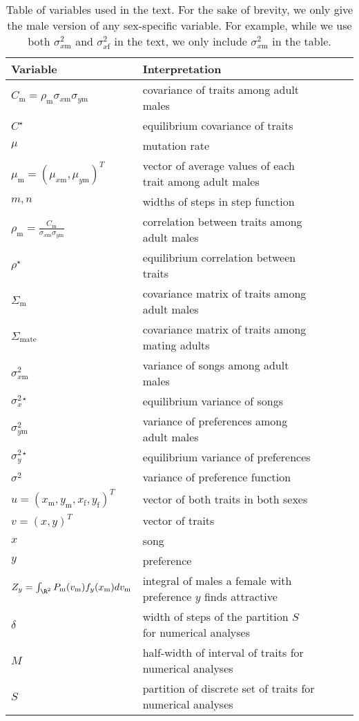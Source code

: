 \documentclass[12pt]{article}
\newcommand{\x}[1]{\text{#1}}
\begin{document}



\newpage

\begin{table}[tp]
\caption{\label{variables} Table of variables used in the text. For the sake of brevity, we only give the male version of any sex-specific variable. For example, while we use both $\sigma_{x\x{m}}^2$ and $\sigma_{x\x{f}}^2$ in the text, we only include $\sigma_{x\x{m}}^2$ in the table.}
\vspace{5pt}
\begin{tabular}{lllll}
Variable & Interpretation
\\\hline $C_\x{m}=\rho_\x{m}\sigma_{x\x{m}}\sigma_{y\x{m}}$ & covariance of traits among adult males
\\ $C^\star$ & equilibrium covariance of traits
\\ $\mu$ & mutation rate 
\\$\mu_\x{m}=(\mu_{x\x{m}},\mu_{y\x{m}})^T$ & vector of average values of each trait among adult males 
\\$m,n$ & widths of steps in step function 
\\ $\rho_\x{m}=\frac{C_\x{m}}{\sigma_{x\x{m}}\sigma_{y\x{m}}}$ & correlation between traits among adult males
\\ $\rho^\star$ & equilibrium correlation between traits
\\$\Sigma_\x{m}$ & covariance matrix of traits among adult males
\\$\Sigma_\text{mate}$ & covariance matrix of traits among mating adults
\\$\sigma_{x\x{m}}^2$ & variance of songs among adult males
\\$\sigma_{x}^{2\star}$ & equilibrium variance of songs
\\$\sigma_{y\x{m}}^2$ & variance of preferences among adult males
\\$\sigma_y^{2\star}$ & equilibrium variance of preferences
\\$\sigma^2$ & variance of preference function
\\$u=(x_\x{m},y_\x{m},x_\x{f},y_\x{f})^T$ & vector of both traits in both sexes
\\$v=(x,y)^T$ & vector of traits
\\$x$ & song
\\$y$ & preference
\\$Z_y=\int_{\R^2}P_\x{m}(v_\x{m})f_{y}(x_\x{m})dv_\x{m}$ & integral of males a female with preference $y$ finds attractive
\\ $\delta$ & width of steps of the partition $S$ for numerical analyses
\\ $M$ & half-width of interval of traits for numerical analyses
\\ $S$ & partition of discrete set of traits for numerical analyses
\end{tabular}
\end{table}
\end{document}
